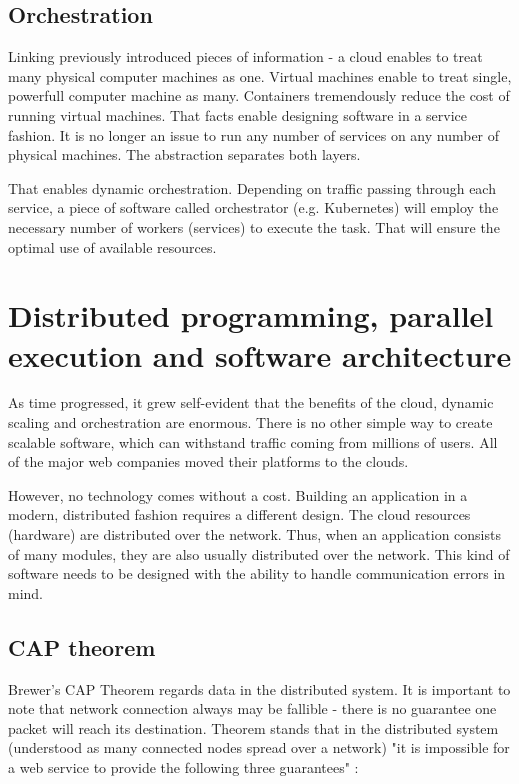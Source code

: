 \subsection{Orchestration}
\label{subsec:orchestration}

Linking previously introduced pieces of information - a cloud enables to treat many physical computer machines as one. Virtual machines enable to treat single, powerfull computer machine as many. Containers tremendously reduce the cost of running virtual machines. That facts enable designing software in a service fashion. It is no longer an issue to run any number of services on any number of physical machines. The abstraction separates both layers.

That enables dynamic orchestration. Depending on traffic passing through each service, a piece of software called orchestrator (e.g. Kubernetes) will employ the necessary number of workers (services) to execute the task. That will ensure the optimal use of available resources. 



\section{Distributed programming, parallel execution and software architecture}
\label{sec:distributedProgramming}

As time progressed, it grew self-evident that the benefits of the cloud, dynamic scaling and orchestration are enormous. There is no other simple way to create scalable software, which can withstand traffic coming from millions of users. All of the major web companies moved their platforms to the clouds. 

However, no technology comes without a cost. Building an application in a modern, distributed fashion requires a different design. The cloud resources (hardware) are distributed over the network. Thus, when an application consists of many modules, they are also usually distributed over the network. This kind of software needs to be designed with the ability to handle communication errors in mind. 

\subsection{CAP theorem}
\label{subsec:capTheorem}

Brewer's CAP Theorem regards data in the distributed system. It is important to note that network connection always may be fallible - there is no guarantee one packet will reach its destination. Theorem stands that in the distributed system (understood as many connected nodes spread over a network) "it is impossible for a web service to provide the following three guarantees" \cite{cap}:

